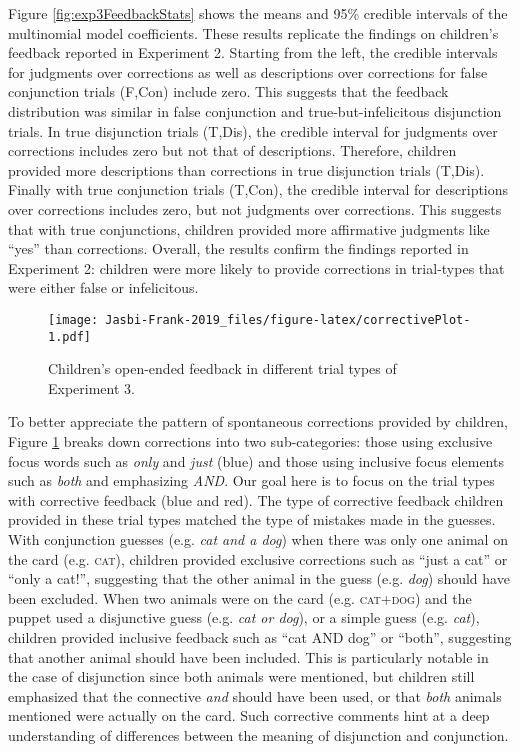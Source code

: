 \documentclass[,man,floatsintext]{apa6}
\begin{document}
Figure \ref{fig:exp3FeedbackStats} shows the means and 95\% credible intervals of the multinomial model coefficients. These results replicate the findings on children's feedback reported in Experiment 2. Starting from the left, the credible intervals for judgments over corrections as well as descriptions over corrections for false conjunction trials (F,Con) include zero. This suggests that the feedback distribution was similar in false conjunction and true-but-infelicitous disjunction trials. In true disjunction trials (T,Dis), the credible interval for judgments over corrections includes zero but not that of descriptions. Therefore, children provided more descriptions than corrections in true disjunction trials (T,Dis). Finally with true conjunction trials (T,Con), the credible interval for descriptions over corrections includes zero, but not judgments over corrections. This suggests that with true conjunctions, children provided more affirmative judgments like \enquote{yes} than corrections. Overall, the results confirm the findings reported in Experiment 2: children were more likely to provide corrections in trial-types that were either false or infelicitous.

\begin{figure}
\centering
\texttt{[image: Jasbi-Frank-2019\_files/figure-latex/correctivePlot-1.pdf]}
\caption{\label{fig:correctivePlot}Children's open-ended feedback in different trial types of Experiment 3.}
\end{figure}

To better appreciate the pattern of spontaneous corrections provided by children, Figure \ref{fig:correctivePlot} breaks down corrections into two sub-categories: those using exclusive focus words such as \emph{only} and \emph{just} (blue) and those using inclusive focus elements such as \emph{both} and emphasizing \emph{AND}. Our goal here is to focus on the trial types with corrective feedback (blue and red). The type of corrective feedback children provided in these trial types matched the type of mistakes made in the guesses. With conjunction guesses (e.g. \emph{cat and a dog}) when there was only one animal on the card (e.g. \textsc{cat}), children provided exclusive corrections such as \enquote{just a cat} or \enquote{only a cat!}, suggesting that the other animal in the guess (e.g. \emph{dog}) should have been excluded. When two animals were on the card (e.g. \textsc{cat+dog}) and the puppet used a disjunctive guess (e.g. \emph{cat or dog}), or a simple guess (e.g. \emph{cat}), children provided inclusive feedback such as \enquote{cat AND dog} or \enquote{both}, suggesting that another animal should have been included. This is particularly notable in the case of disjunction since both animals were mentioned, but children still emphasized that the connective \emph{and} should have been used, or that \emph{both} animals mentioned were actually on the card. Such corrective comments hint at a deep understanding of differences between the meaning of disjunction and conjunction.
\end{document}
